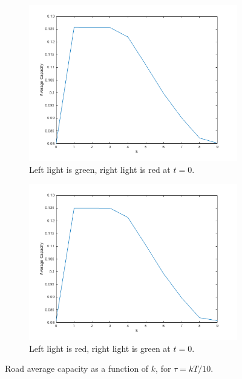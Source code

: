 \documentclass[10pt]{article}
\begin{document}
\begin{figure}[H]
        \centering
        \begin{subfigure}[b]{0.5\textwidth}
                \centering
                \includegraphics[width=\textwidth]{figures/greenred.png}
                \caption{Left light is green, right light is red at \(t=0\).}
        \end{subfigure}%
        \begin{subfigure}[b]{0.5\textwidth}
                \centering
                \includegraphics[width=\textwidth]{figures/redgreen.png}
                \caption{Left light is red, right light is green at \(t=0\).}
        \end{subfigure}%
        \caption{Road average capacity as a function of \(k\), for \(\tau=kT/10\). }
\end{figure}
\end{document}

